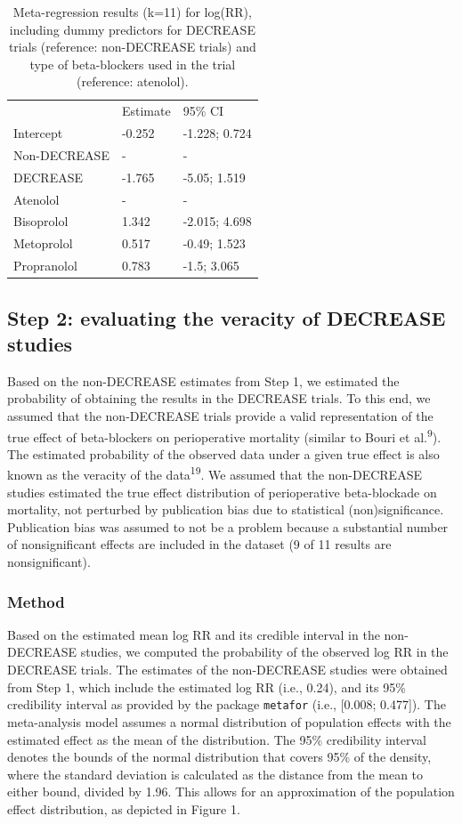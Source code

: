 \documentclass[]{article}
\begin{document}
\begin{longtable}[]{@{}lll@{}}
\caption{Meta-regression results (k=11) for log(RR), including dummy
predictors for DECREASE trials (reference: non-DECREASE trials) and type
of beta-blockers used in the trial (reference:
atenolol).}\tabularnewline
\toprule
& Estimate & 95\% CI\tabularnewline
Intercept & -0.252 & -1.228; 0.724\tabularnewline
Non-DECREASE & - & -\tabularnewline
DECREASE & -1.765 & -5.05; 1.519\tabularnewline
Atenolol & - & -\tabularnewline
Bisoprolol & 1.342 & -2.015; 4.698\tabularnewline
Metoprolol & 0.517 & -0.49; 1.523\tabularnewline
Propranolol & 0.783 & -1.5; 3.065\tabularnewline
\bottomrule
\end{longtable}

\subsection{Step 2: evaluating the veracity of DECREASE
studies}\label{step-2-evaluating-the-veracity-of-decrease-studies}

Based on the non-DECREASE estimates from Step 1, we estimated the
probability of obtaining the results in the DECREASE trials. To this
end, we assumed that the non-DECREASE trials provide a valid
representation of the true effect of beta-blockers on perioperative
mortality (similar to Bouri et al.\textsuperscript{9}). The estimated
probability of the observed data under a given true effect is also known
as the veracity of the data\textsuperscript{19}. We assumed that the
non-DECREASE studies estimated the true effect distribution of
perioperative beta-blockade on mortality, not perturbed by publication
bias due to statistical (non)significance. Publication bias was assumed
to not be a problem because a substantial number of nonsignificant
effects are included in the dataset (9 of 11 results are
nonsignificant).

\subsubsection{Method}\label{method}

Based on the estimated mean log RR and its credible interval in the
non-DECREASE studies, we computed the probability of the observed log RR
in the DECREASE trials. The estimates of the non-DECREASE studies were
obtained from Step 1, which include the estimated log RR (i.e., 0.24),
and its 95\% credibility interval as provided by the package
\texttt{metafor} (i.e., {[}0.008; 0.477{]}). The meta-analysis model
assumes a normal distribution of population effects with the estimated
effect as the mean of the distribution. The 95\% credibility interval
denotes the bounds of the normal distribution that covers 95\% of the
density, where the standard deviation is calculated as the distance from
the mean to either bound, divided by 1.96. This allows for an
approximation of the population effect distribution, as depicted in
Figure 1.
\end{document}
